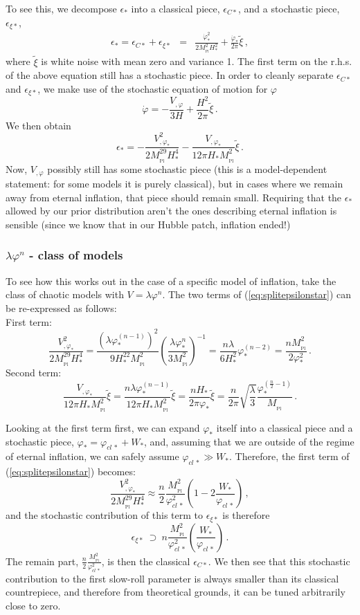 \documentclass[prd, onecolumn, floatfix, letterpaper, nofootinbib, amsmath, amssymb, superscriptaddress]{revtex4}
\renewcommand{\(}{\left(}
\renewcommand{\)}{\right)}
\renewcommand{\[}{\left[}
\renewcommand{\]}{\right]}
\def\be{\begin{equation}}
\def\ee{\end{equation}}
\def\bea{\begin{eqnarray}}
\def\eea{\end{eqnarray}}
\newcommand{\Mp}{M_{_\mathrm{Pl}}}
\begin{document}
To see this, we decompose $\epsilon_*$ into a classical piece, $\epsilon_{C*}$, and a stochastic piece, $\epsilon_{\xi*}$,
\bea
\label{eq:epsilonsplitdotvarphi}
	\epsilon_*=\epsilon_{C*}+\epsilon_{\xi*}&= &\frac{\dot\varphi_*^2}{2\Mp^2H_*^2}+\frac{\dot\varphi_*}{2\pi}\tilde{\xi}\, ,
\eea
where $\tilde\xi$ is white noise with mean zero and variance 1. The first term on the r.h.s. of the above equation still has a stochastic piece. In order to cleanly separate $\epsilon_{C*}$ and $\epsilon_{\xi*}$, we make use of the stochastic equation of motion for $\varphi$
\be
	\dot\varphi=-\frac{V_{,\varphi}}{3H}+\frac{H^2}{2\pi}\tilde\xi\, . 
\ee
We then obtain 
\be
\label{eq:splitepsilonstar}
	\epsilon_*=-\frac{V_{,\varphi_*}^2}{2\Mp^29H_*^4}-\frac{V_{,\varphi_*}}{12\pi H_*\Mp^2}\tilde{\xi}\, .
\ee 
Now, $V_{,\varphi}$ possibly still has some stochastic piece (this is a model-dependent statement: for some models it is purely classical), but in cases where we remain away from eternal inflation, that piece should remain small. Requiring that the $\epsilon_*$ allowed by our prior distribution aren't the ones describing eternal inflation is sensible (since we know that in our Hubble patch, inflation ended!)

\subsubsection{$\lambda\varphi^n$ - class of models}
To see how this works out in the case of a specific model of inflation, take the class of chaotic models with $V=\lambda\varphi^n$. The two terms of (\ref{eq:splitepsilonstar}) can be re-expressed as follows:
\\
First term:
\be
	\frac{V_{,\varphi_*}^2}{2\Mp^29H_*^4}=\frac{\left(\lambda\varphi_*^{(n-1)}\right)^2}{9H_*^22\Mp^2}\left(\frac{\lambda \varphi_*^n}{3\Mp^2}\right)^{-1}=\frac{n\lambda}{6 H_*^2}\varphi^{(n-2)}_*=\frac{n\Mp^2}{2\varphi_*^2}\, .
\ee
Second term:
\be
	\frac{V_{,\varphi_*}}{12\pi H_*\Mp^2}\tilde{\xi}=\frac{n\lambda\varphi_*^{(n-1)}}{12\pi H_*\Mp^2}\tilde\xi= \frac{nH_*}{2\pi\varphi_*}\tilde\xi=\frac{n}{2\pi}\sqrt{\frac{\lambda}{3}}\frac{\varphi_*^{(\frac{n}{2}-1)}}{\Mp}\, .
\ee

Looking at the first term first, we can expand $\varphi_*$ itself into a classical piece and a stochastic piece, $\varphi_*=\varphi_{cl\,*}+W_*$, and, assuming that we are outside of the regime of eternal inflation, we can safely assume $\varphi_{cl\,*}\gg W_*$. Therefore, the first term of (\ref{eq:splitepsilonstar}) becomes:
\be
	\frac{V_{,\varphi_*}^2}{2\Mp^29H_*^4}\approx \frac{n}{2}\frac{\Mp^2}{\varphi_{cl\,*}^2}\left( 1-2 \frac{W_*}{\varphi_{cl\, *}}\right)\, ,
\ee
and the stochastic contribution of this term to $\epsilon_{\xi*}$ is therefore 
\be
	\epsilon_{\xi*}  ~ \supset~ n\frac{\Mp^2}{\varphi_{cl\,*}^2}\left(  \frac{W_*}{\varphi_{cl\, *}}\right)\, .
\ee
The remain part, $ \frac{n}{2}\frac{\Mp^2}{\varphi_{cl\,*}^2}$, is then the classical $\epsilon_{C*}$. We then see that this stochastic contribution to the first slow-roll parameter is always smaller than its classical countrepiece, and therefore from theoretical grounds, it can be tuned arbitrarily close to zero. 
\end{document}
